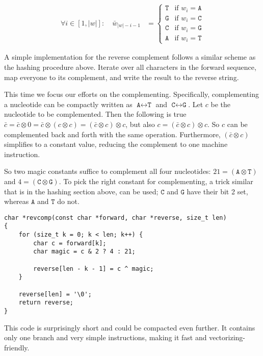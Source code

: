 \documentclass[10pt,letterpaper]{article}
\begin{document}

\begin{align*}
	\forall i\in[1,|w|]\colon \quad {\bar w}_{|w|-i-1} &=
		\begin{cases}
			\texttt{T} & \text{if } w_i = \texttt{A} \\
			\texttt{G} & \text{if } w_i = \texttt{C} \\
			\texttt{C} & \text{if } w_i = \texttt{G} \\
			\texttt{A} & \text{if } w_i = \texttt{T}
		\end{cases}
\end{align*}

A simple implementation for the reverse complement follows a similar scheme as the hashing procedure above. Iterate over all characters in the forward sequence, map everyone to its complement, and write the result to the reverse string.

This time we focus our efforts on the complementing. Specifically, complementing a nucleotide can be compactly written as $\texttt{A} \leftrightarrow \texttt{T}$ and $\texttt{C} \leftrightarrow \texttt{G}$. Let $c$ be the nucleotide to be complemented. Then the following is true $\bar c = \bar c \otimes 0 = \bar c \otimes (c \otimes c) = (\bar c \otimes c) \otimes c$, but also $c = (\bar c \otimes c) \otimes c$. So $c$ can be complemented back and forth with the same operation. Furthermore, $(\bar c \otimes c)$ simplifies to a constant value, reducing the complement to one machine instruction.

So two magic constants suffice to complement all four nucleotides: $21 = (\texttt{A} \otimes \texttt{T})$ and $4 = (\texttt{C} \otimes \texttt{G})$. To pick the right constant for complementing, a trick similar that is in the hashing section above, can be used; $\texttt{C}$ and $\texttt{G}$ have their bit 2 set, whereas $\texttt{A}$ and $\texttt{T}$ do not.


\begin{lstlisting}
char *revcomp(const char *forward, char *reverse, size_t len)
{
	for (size_t k = 0; k < len; k++) {
		char c = forward[k];
		char magic = c & 2 ? 4 : 21;

		reverse[len - k - 1] = c ^ magic;
	}

	reverse[len] = '\0';
	return reverse;
}
\end{lstlisting}

This code is surprisingly short and could be compacted even further. It contains only one branch and very simple instructions, making it fast and vectorizing-friendly.
\end{document}
